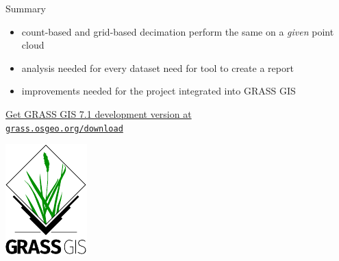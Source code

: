 \documentclass[xcolor={dvipsnames,usenames},beamer,aspectratio=169]{beamer}
\begin{document}
\begin{frame}{}

\vspace*{0.05\textheight}

\begin{block}{Summary}
 \begin{itemize}
  \item count-based and grid-based decimation perform the same on a \emph{given} point cloud
  \item analysis needed for every dataset \textrightarrow{} need for tool to create a report
  \item improvements needed for the project integrated into GRASS GIS
 \end{itemize}
\end{block}

\bigskip

\centering
\href{https://grass.osgeo.org/download/}{%
Get GRASS GIS 7.1 development version at\\
\texttt{grass.osgeo.org/download}%
}

\smallskip

\includegraphics[height=0.25\textheight]{logos/grass_gis}


\end{frame}
\end{document}
